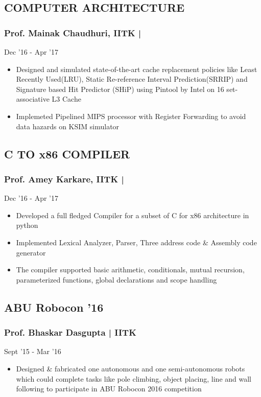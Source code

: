 \documentclass[letterpaper]{twentysecondcv} %
\begin{document}
\subsection{COMPUTER ARCHITECTURE}
\subsubsection{Prof. Mainak Chaudhuri, IITK | } \hfill{} Dec '16 - Apr '17

\begin{itemize}
\item Designed and simulated state-of-the-art cache replacement policies like Least Recently Used(LRU), Static Re-reference Interval Prediction(SRRIP) and Signature based Hit Predictor (SHiP) using Pintool by Intel on 16 set-associative L3 Cache
\item Implemeted Pipelined MIPS processor with Register Forwarding to avoid data hazards on KSIM simulator
\end{itemize}

\subsection{C TO x86 COMPILER}
\subsubsection{Prof. Amey Karkare, IITK | } \hfill{} Dec '16 - Apr '17

\begin{itemize}
\item Developed a full fledged Compiler for a subset of C for x86 architecture in python
\item Implemented Lexical Analyzer, Parser, Three address code \& Assembly code generator
\item The compiler supported basic arithmetic, conditionals, mutual recursion, parameterized functions, global declarations and scope handling
\end{itemize}


\subsection{ABU Robocon '16}
\subsubsection{Prof. Bhaskar Dasgupta | IITK} \hfill{} Sept '15 - Mar '16
\begin{itemize}
\item Designed \& fabricated one autonomous and one semi-autonomous robots which could complete tasks like pole climbing, object placing, line and wall following to participate in ABU Robocon 2016 competition
\end{itemize}
\end{document}
